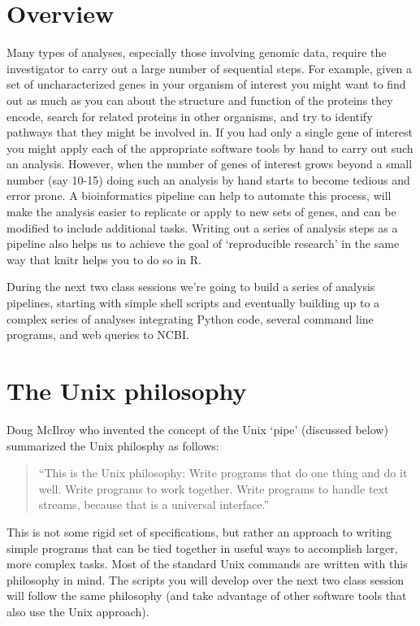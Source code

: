 
\section{Overview}

Many types of analyses, especially those involving genomic data, require the investigator to carry out a large number of sequential steps. For example, given a set of uncharacterized genes in your organism of interest you might want to find out as much as you can about the structure and function of the proteins they encode, search for related proteins in other organisms, and try to identify pathways that they might be involved in. If you had only a single gene of interest you might apply each of the appropriate software tools by hand to carry out such an analysis. However, when the number of genes of interest grows beyond a small number (say 10-15) doing such an analysis by hand starts to become tedious and error prone.  A bioinformatics pipeline can help to automate this process, will make the analysis easier to replicate or apply to new sets of genes, and can be modified to include additional tasks.  Writing out a series of analysis steps as a pipeline also helps us to achieve the goal of `reproducible research' in the same way that knitr helps you to do so in R.

During the next two class sessions we're going to build a series of analysis pipelines, starting with simple shell scripts and eventually building up to a complex series of analyses integrating Python code, several command line programs, and web queries to NCBI.


\section{The Unix philosophy}

Doug McIlroy who invented the concept of the Unix `pipe' (discussed below) summarized the Unix philosphy as follows:

\begin{quote}
``This is the Unix philosophy: Write programs that do one thing and do it well. Write programs to work together. Write programs to handle text streams, because that is a universal interface.''
\end{quote}

This is not some rigid set of specifications, but rather an approach to writing simple programs that can be tied together in useful ways to accomplish larger, more complex tasks. Most of the standard Unix commands are written with this philosophy in mind. The scripts you will develop over the next two class session will follow the same philosophy (and take advantage of other software tools that also use the Unix approach).

